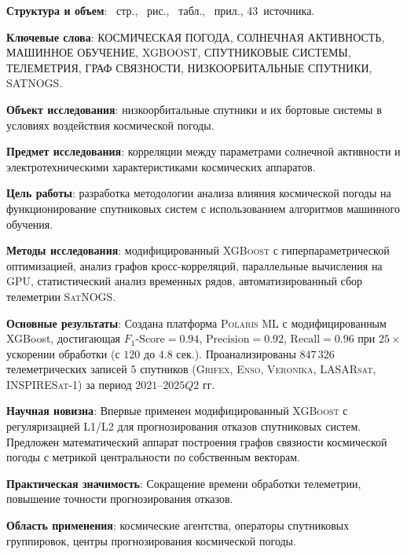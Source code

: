 \textbf{Структура и объем}: \pageref{LastPage}~стр., \totalfigures~рис., \totaltables~табл., ~прил., 43~источника.

\textbf{Ключевые слова}: КОСМИЧЕСКАЯ ПОГОДА, СОЛНЕЧНАЯ АКТИВНОСТЬ, МАШИННОЕ ОБУЧЕНИЕ, XGBOOST, СПУТНИКОВЫЕ СИСТЕМЫ, ТЕЛЕМЕТРИЯ, ГРАФ СВЯЗНОСТИ, НИЗКООРБИТАЛЬНЫЕ СПУТНИКИ, SATNOGS.

\textbf{Объект исследования}: низкоорбитальные спутники и их бортовые системы в условиях воздействия космической погоды.

\textbf{Предмет исследования}: корреляции между параметрами солнечной активности и электротехническими характеристиками космических аппаратов.

\textbf{Цель работы}: разработка методологии анализа влияния космической погоды на функционирование спутниковых систем с использованием алгоритмов машинного обучения.

\textbf{Методы исследования}: модифицированный \textsc{XGBoost} с гиперпараметрической оптимизацией, анализ графов кросс-корреляций, параллельные вычисления на \textsc{GPU}, статистический анализ временных рядов, автоматизированный сбор телеметрии \textsc{SatNOGS}.

\textbf{Основные результаты}: Создана платформа \textsc{Polaris ML} с модифицированным XGBoost, достигающая $F_1\text{-Score} = 0.94$, $\text{Precision} = 0.92$, $\text{Recall} = 0.96$ при $25{\times}$ ускорении обработки (с $120$ до $4.8$ сек.). Проанализированы $847{\,}326$ телеметрических записей $5$ спутников (\textsc{Grifex}, \textsc{Enso}, \textsc{Veronika}, \textsc{LASARsat}, \textsc{INSPIRESat-1}) за период $2021$--$2025Q2$ гг.

\textbf{Научная новизна}: Впервые применен модифицированный \textsc{XGBoost} с регуляризацией L1/L2 для прогнозирования отказов спутниковых систем. Предложен математический аппарат построения графов связности космической погоды с метрикой центральности по собственным векторам.

\textbf{Практическая значимость}: Сокращение времени обработки телеметрии, повышение точности прогнозирования отказов.

\textbf{Область применения}: космические агентства, операторы спутниковых группировок, центры прогнозирования космической погоды.
